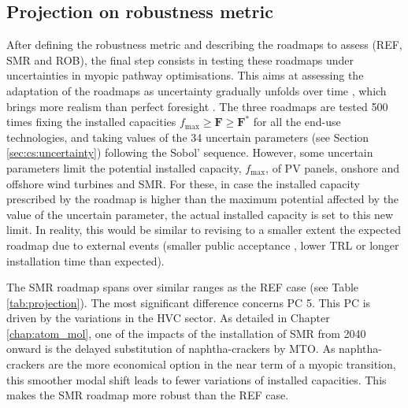 \subsection{Projection on robustness metric}
\label{subsec:RobPol:Projection}
After defining the robustness metric and describing the roadmaps to assess (\ie REF, SMR and ROB), the final step consists in testing these roadmaps under uncertainties in myopic pathway optimisations. This aims at assessing the adaptation of the roadmaps as uncertainty gradually unfolds over time \cite{moret2020overcapacity}, which brings more realism than perfect foresight \cite{poncelet2016myopic}. The three roadmaps are tested 500 times fixing the installed capacities $f_{\mathrm{max}}\geq\textbf{F}\geq\textbf{F}^*$ for all the end-use technologies, and taking values of the 34 uncertain parameters (see Section \ref{sec:cs:uncertainty}) following the Sobol' sequence. However,  some uncertain parameters limit the potential installed capacity, $f_{\mathrm{max}}$, of \gls{PV} panels, onshore and offshore wind turbines and \gls{SMR}. For these, in case the installed capacity prescribed by the roadmap is higher than the maximum potential affected by the value of the uncertain parameter, the actual installed capacity is set to this new limit. In reality, this would be similar to revising to a smaller extent the expected roadmap due to external events (\eg smaller public acceptance \cite{zoellner2008public,sam2014small}, lower \gls{TRL} or longer installation time than expected).

The SMR roadmap spans over similar ranges as the REF case (see Table \ref{tab:projection}). The most significant difference concerns PC 5. This PC is driven by the variations in the \gls{HVC} sector. As detailed in Chapter \ref{chap:atom_mol}, one of the impacts of the installation of \gls{SMR} from 2040 onward is the delayed substitution of naphtha-crackers by \gls{MTO}. As naphtha-crackers are the more economical option in the near term of a myopic transition, this smoother modal shift leads to fewer variations of installed capacities. This makes the SMR roadmap more robust than the REF case. 


